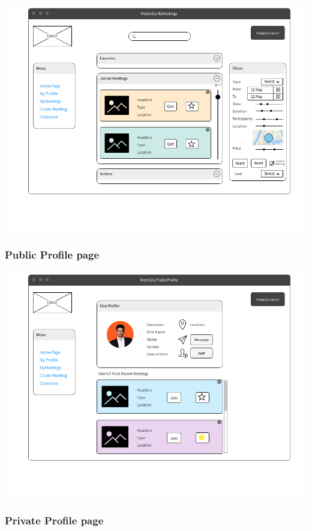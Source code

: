 \documentclass[conference]{IEEEtran}
\begin{document}
\includegraphics[scale=0.3]{pics/mockups/Mymeetings.png}

\subsubsection{Public Profile page} \hspace{10cm}

\includegraphics[scale=0.3]{pics/mockups/PublicProfile.png}

\subsubsection{Private Profile page} \hspace{10cm}
\end{document}
